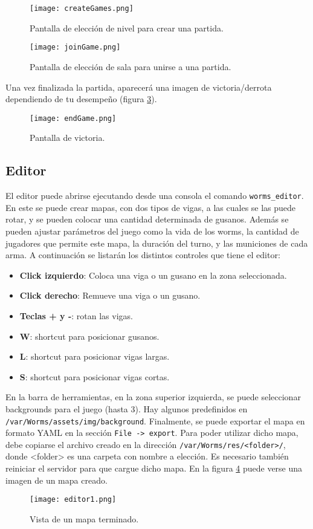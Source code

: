 \begin{figure}[H]
	\centering
	\texttt{[image: createGames.png]}
	\caption{Pantalla de elección de nivel para crear una partida.}
	\label{im:create}
\end{figure}

\begin{figure}[H]
	\centering
	\texttt{[image: joinGame.png]}
	\caption{Pantalla de elección de sala para unirse a una partida.}
	\label{im:join}
\end{figure}

Una vez finalizada la partida, aparecerá una imagen de victoria/derrota dependiendo de tu desempeño (figura \ref{im:fin}).

\begin{figure}[H]
	\centering
	\texttt{[image: endGame.png]}
	\caption{Pantalla de victoria.}
	\label{im:fin}
\end{figure}

\subsection{Editor}
El editor puede abrirse ejecutando desde una consola el comando \texttt{worms\_editor}. En este se puede crear mapas, con dos tipos de vigas, a las cuales se las puede rotar, y se pueden colocar una cantidad determinada de gusanos. Además se pueden ajustar parámetros del juego como la vida de los worms, la cantidad de jugadores que permite este mapa, la duración del turno, y las municiones de cada arma. A continuación se listarán los distintos controles que tiene el editor:

\begin{itemize}
	\item \textbf{Click izquierdo}: Coloca una viga o un gusano en la zona seleccionada.
	\item \textbf{Click derecho}: Remueve una viga o un gusano.
	\item \textbf{Teclas + y -}: rotan las vigas.
	\item \textbf{W}: shortcut para posicionar gusanos.
	\item \textbf{L}: shortcut para posicionar vigas largas.
	\item \textbf{S}: shortcut para posicionar vigas cortas.
\end{itemize}

En la barra de herramientas, en la zona superior izquierda, se puede seleccionar backgrounds para el juego (hasta 3). Hay algunos predefinidos en \texttt{/var/Worms/assets/img/background}. Finalmente, se puede exportar el mapa en formato YAML en la sección \texttt{File -> export}. Para poder utilizar dicho mapa, debe copiarse el archivo creado en la dirección \texttt{/var/Worms/res/<folder>/}, donde <folder> es una carpeta con nombre a elección. Es necesario también reiniciar el servidor para que cargue dicho mapa. En la figura \ref{im:editor} puede verse una imagen de un mapa creado.

\begin{figure}[H]
	\centering
	\texttt{[image: editor1.png]}
	\caption{Vista de un mapa terminado.}
	\label{im:editor}
\end{figure}